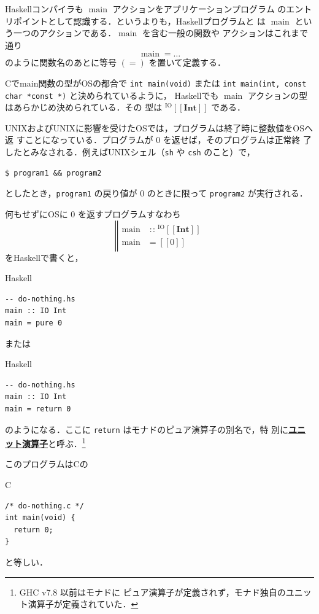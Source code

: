 \documentclass[a5paper,twoside,fleqn,draft]{jsbook}
\def\[{[\![}
\def\]{]\!]}
\newcommand{\programminglanguage}[1]{\textsf{#1}}
\newcommand{\clang}{\programminglanguage{C}}
\newcommand{\haskell}{\programminglanguage{Haskell}}
\newcommand{\keyword}[1]{{\underline{\textbf{#1}}}}
\newcommand{\code}[1]{\texttt{#1}}
\newcommand{\filename}[1]{\texttt{#1}}
\newenvironment{ccode}{\begin{itembox}[r]{\clang}}{\end{itembox}}
\newenvironment{haskellcode}{\begin{itembox}[r]{\haskell}}{\end{itembox}}
\newcommand{\mBrace}{\Vert}
\newcommand{\mAction}[1]{\mathrm{#1}}
\DeclareMathOperator{\mMain}{\mAction{main}}
\DeclareMathOperator{\mIn}{{:\!:}}
\newcommand{\mType}[1]{\mathbf{#1}} %
\newcommand{\mIntType}{\mType{Int}}
\newcommand{\mTypeAssemble}[2]{{}^\mathrm{#1}\[\mType{#2}\]}
\newcommand{\mIOType}[1]{\mTypeAssemble{IO}{#1}}
\newcommand{\mIOIntType}{\mIOType{\mIntType}}
\newcommand{\mPureWith}[1]{\[#1\]}
\begin{document}
\haskell コンパイラも $\mMain$ アクションをアプリケーションプログラム
のエントリポイントとして認識する．というよりも，\haskell プログラムと
は $\mMain$ という一つのアクションである．$\mMain$ を含む一般の関数や
アクションはこれまで通り
\begin{equation}
\mMain=\dots
\end{equation}
のように関数名のあとに等号 $(=)$ を置いて定義する．

\clang でmain関数の型がOSの都合で \code{int main(void)} または
\code{int main(int, const char *const *)} と決められているように，
\haskell でも $\mMain$ アクションの型はあらかじめ決められている．その
型は $\mIOIntType$ である．

UNIXおよびUNIXに影響を受けたOSでは，プログラムは終了時に整数値をOSへ返
すことになっている．プログラムが $0$ を返せば，そのプログラムは正常終
了したとみなされる．例えばUNIXシェル（\filename{sh} や \filename{csh}
  のこと）で，
\begin{verbatim}
$ program1 && program2
\end{verbatim}
としたとき，\filename{program1} の戻り値が $0$ のときに限って
\filename{program2} が実行される．

何もせずにOSに $0$ を返すプログラムすなわち
\begin{equation}
\left\mBrace
\begin{aligned}
\mMain&\mIn{}\mIOIntType\\
\mMain&=\mPureWith{0}
\end{aligned}
\right.
\end{equation}
を\haskell で書くと，
\begin{haskellcode}
\begin{verbatim}
-- do-nothing.hs
main :: IO Int
main = pure 0
\end{verbatim}
\end{haskellcode}
または
\begin{haskellcode}
\begin{verbatim}
-- do-nothing.hs
main :: IO Int
main = return 0
\end{verbatim}
\end{haskellcode}
のようになる．ここに \code{return} はモナドのピュア演算子の別名で，特
別に\keyword{ユニット演算子}と呼ぶ．\footnote{GHC v7.8 以前はモナドに
  ピュア演算子が定義されず，モナド独自のユニット演算子が定義されていた．}

このプログラムは\clang の
\begin{ccode}
\begin{verbatim}
/* do-nothing.c */
int main(void) {
  return 0;
}
\end{verbatim}
\end{ccode}
と等しい．
\end{document}
